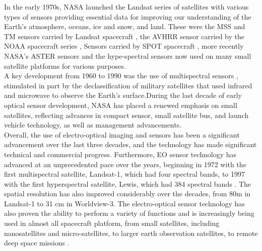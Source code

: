 \documentclass[final,5p,times,twocolumn,authoryear]{elsarticle}
\begin{document}
In the early 1970s, NASA launched the Landsat series of satellites with various types of sensors providing essential data for improving our understanding of the Earth's atmosphere, oceans, ice and snow, and land. These were the MSS and TM sensors carried by Landsat spacecraft \citep{wulder2019current}, the AVHRR sensor carried by the NOAA spacecraft series \citep{oesterheld1998relation}, Sensors carried by SPOT spacecraft \citep{Tatem2008FiftyYO}, more recently NASA's ASTER sensors and the hype-spectral sensors \citep{prentice2021design} now used on many small satellite platforms for various purposes. \\
A key development from 1960 to 1990 was the use of multispectral sensors \citep{Tatem2008FiftyYO}, stimulated in part by the declassification of military satellites that used infrared and microwave to observe the Earth's surface.During the last decade of early optical sensor development, NASA has placed a renewed emphasis on small satellites, reflecting advances in compact sensor, small satellite bus, and launch vehicle technology, as well as management advancements.\\
Overall, the use of electro-optical imaging and sensors has been a significant advancement over the last three decades, and the technology has made significant technical and commercial progress. Furthermore, EO sensor technology has advanced at an unprecedented pace over the years, beginning in 1972 with the first multispectral satellite, Landsat-1, which had four spectral bands, to 1997 with the first hyperspectral satellite, Lewis, which had 384 spectral bands \citep{zhu2018review}. The spatial resolution has also improved considerably over the decades, from 80m in Landsat-1 to 31 cm in Worldview-3.  The electro-optical sensor technology has also proven the ability to perform a variety of functions and is increasingly being used in almost all spacecraft platform, from small satellites, including nanosatellites and micro-satellites, to larger earth observation satellites, to remote deep space missions \citep{chauhan2015hyperspectral}. 
\end{document}
